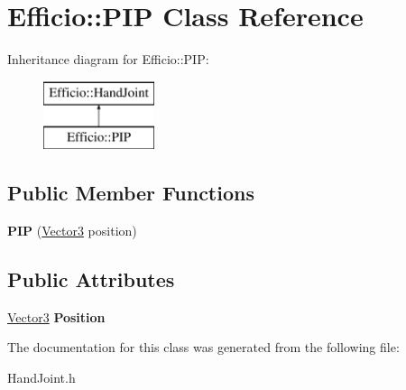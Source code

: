 \hypertarget{class_efficio_1_1_p_i_p}{}\section{Efficio\+:\+:P\+IP Class Reference}
\label{class_efficio_1_1_p_i_p}
Inheritance diagram for Efficio\+:\+:P\+IP\+:\begin{figure}[H]
\begin{center}
\leavevmode
\includegraphics[height=2.000000cm]{class_efficio_1_1_p_i_p}
\end{center}
\end{figure}
\subsection*{Public Member Functions}
\begin{DoxyCompactItemize}
\item 
{\bfseries P\+IP} (\hyperlink{class_efficio_1_1_vector3}{Vector3} position)\hypertarget{class_efficio_1_1_p_i_p_adbeea34fdcf9cd9941853c90d0b8c308}{}\label{class_efficio_1_1_p_i_p_adbeea34fdcf9cd9941853c90d0b8c308}

\end{DoxyCompactItemize}
\subsection*{Public Attributes}
\begin{DoxyCompactItemize}
\item 
\hyperlink{class_efficio_1_1_vector3}{Vector3} {\bfseries Position}\hypertarget{class_efficio_1_1_p_i_p_a9744a800843c2efc937c770513ffd36c}{}\label{class_efficio_1_1_p_i_p_a9744a800843c2efc937c770513ffd36c}

\end{DoxyCompactItemize}


The documentation for this class was generated from the following file\+:\begin{DoxyCompactItemize}
\item 
Hand\+Joint.\+h\end{DoxyCompactItemize}

